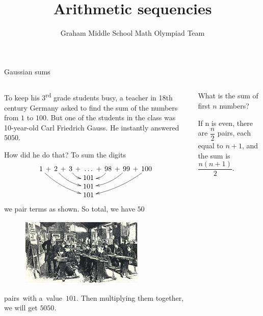 \documentclass[9pt,aspectratio=169]{beamer}
\title{Arithmetic sequencies}
\subtitle[Graham Middle School]{Graham Middle School Math Olympiad Team}
\begin{document}
\maketitle

\begin{frame}{Gaussian sums}
  \begin{columns}[T]
    \begin{column}{0.5\textwidth}
      To keep his 3\textsuperscript{rd} grade students busy, a teacher in 18th century Germany asked to find the sum of the numbers from $1$ to $100$. But one of the students in the class was 10-year-old Carl Friedrich Gauss.  He instantly answered $5050$.

      How did he do that?  To sum the digits 
      \[ \xymatrix@C=-2pt@R=0pt{
        1\ar@/_/[dddrrrrr] & + & 2\ar@/_/[ddrrr] & + & 3\ar@/_/[dr] & +\ \ldots\ + & 98\ar@/^/[dl] & + & 99\ar@/^/[ddlll] & + & 100\ar@/^/[dddlllll] \\
        & & & & & 101 & & & & & \\
        & & & & & 101 & & & & & \\
        & & & & & 101 & & & & & 
      } \]
      we pair terms as shown. So total, we have $50$
      \begin{figure}
        \vspace*{-1.3em}
        \hspace*{-1em}
        \includegraphics[width=0.8\textwidth]{06 - Arithmetic Sequences/school.png}
      \end{figure}
      pairs~with 
      a~value~$101$. 
      Then multiplying them together, we will get $5050$.
    \end{column}
    \begin{column}{0.5\textwidth}
      \begin{problem}
        What is the sum of first $n$ numbers?
      \end{problem}
      If n is even, there are $\dfrac{n}{2}$ pairs, each equal to $n+1$, and the sum is $\dfrac{n \left(n + 1\right)}{2}$.  
      

\end{column}
\end{columns}
\end{frame}
\end{document}
